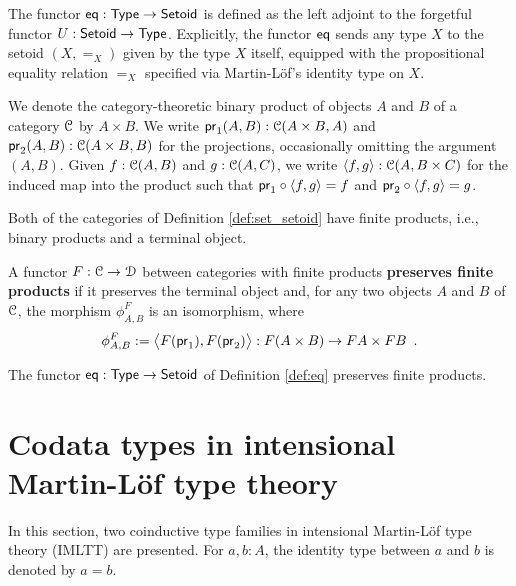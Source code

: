 \documentclass[a4paper,USenglish]{lipics}
\newcommand{\parencite}[1]{\cite{#1}}
\newcommand{\fat}[1]{\textbf{#1}}
\begin{document}
\begin{definition}
\label{def:eq}
 The functor $\eq : \Set\to\Setoid$ is defined as the left adjoint to the forgetful functor $U : \Setoid \to \Set$.
  Explicitly, the functor $\eq$ sends any type $X$ to the setoid $(X,=_X)$ given by the type $X$ itself, equipped
  with the propositional equality relation $=_X$ specified via Martin-L\"of's identity type on $X$.
\end{definition}


\begin{rem}
  We denote the category-theoretic binary product of objects $A$ and $B$ of a category $\C$ by $A\times B$.
  We write $\pr_1(A,B) : \C(A\times B, A)$ and $\pr_2(A,B) :\C(A\times B, B)$ for the projections, occasionally omitting the 
  argument $(A,B)$.
  Given $f : \C(A, B)$ and $g : \C(A,C)$, we write $\langle f,g\rangle : \C(A,B\times C)$ for the induced map into the product such that
  $\comp{\langle f,g\rangle}{\pr_1} = f$ and $\comp{\langle f,g\rangle}{\pr_2} = g$.
\end{rem}

Both of the categories of Definition \ref{def:set_setoid} have finite products, i.e., binary products and a terminal object.

\begin{definition}
\label{def:monoidal_functor}
 A functor $F:\C\to\D$ between categories with finite products \fat{preserves finite products} if it preserves the terminal object and,
 for any two objects $A$ and $B$ of $\C$,
  the morphism $\phi^F_{A,B}$ is an isomorphism, where
 \[ \phi^F_{A,B} := \bigl\langle F(\pr_1), F(\pr_2) \bigr\rangle : F(A \times B) \to FA\times FB \enspace . \] %
\end{definition}

\begin{example}
  The functor $\eq: \Set \to \Setoid$ of Definition \ref{def:eq} preserves finite products.
\end{example}


\section{Codata types in intensional Martin-L\"of type theory}\label{sec:tri}

In this section, two coinductive type families in intensional Martin-L\"of type theory (IMLTT) \parencite{martin_lof} are presented.
For $a,b : A$, the identity type between $a$ and $b$ is denoted by $a = b$.
\end{document}
